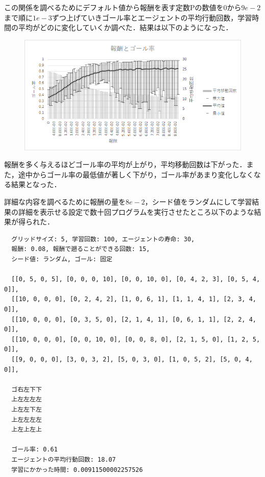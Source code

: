 \documentclass[a4j,11pt]{jarticle}
\begin{document}
この関係を調べるためにデフォルト値から報酬を表す定数Pの数値を$0$から$9e-2$まで順に$1e-3$ずつ上げていきゴール率とエージェントの平均行動回数，学習時間の平均がどのに変化していくか調べた．結果は以下のようになった．

\begin{figure}[ht]
  \begin{center}
    \includegraphics[scale=1.5]{img/changeP.png}
  \end{center}
\end{figure}

報酬を多く与えるほどゴール率の平均が上がり，平均移動回数は下がった．また，途中からゴール率の最低値が著しく下がり，ゴール率があまり変化しなくなる結果となった．

詳細な内容を調べるために報酬の量を$8e-2$，シード値をランダムにして学習結果の詳細を表示せる設定で数十回プログラムを実行させたところ以下のような結果が得られた．

\begin{verbatim}
  グリッドサイズ: 5, 学習回数: 100, エージェントの寿命: 30,
  報酬: 0.08, 報酬で遡ることができる回数: 15,
  シード値: ランダム, ゴール: 固定

  [[0, 5, 0, 5], [0, 0, 0, 10], [0, 0, 10, 0], [0, 4, 2, 3], [0, 5, 4, 0]],
  [[10, 0, 0, 0], [0, 2, 4, 2], [1, 0, 6, 1], [1, 1, 4, 1], [2, 3, 4, 0]],
  [[10, 0, 0, 0], [0, 3, 5, 0], [2, 1, 4, 1], [0, 6, 1, 1], [2, 2, 4, 0]],
  [[10, 0, 0, 0], [0, 0, 10, 0], [0, 0, 8, 0], [2, 1, 5, 0], [1, 2, 5, 0]],
  [[9, 0, 0, 0], [3, 0, 3, 2], [5, 0, 3, 0], [1, 0, 5, 2], [5, 0, 4, 0]],

  ゴ右左下下
  上左左左左
  上左左下左
  上左左左左
  上左上左上

  ゴール率: 0.61
  エージェントの平均行動回数: 18.07
  学習にかかった時間: 0.00911500002257526
\end{verbatim}

\newpage
\end{document}
